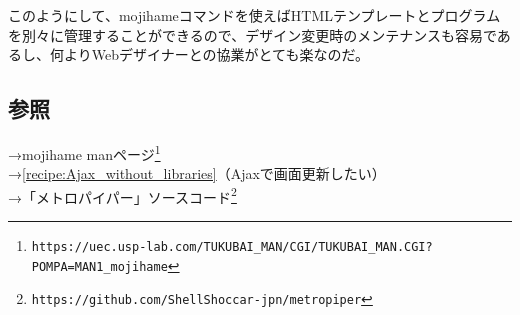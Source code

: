 このようにして、mojihameコマンドを使えばHTMLテンプレートとプログラムを別々に管理することができるので、デザイン変更時のメンテナンスも容易であるし、何よりWebデザイナーとの協業がとても楽なのだ。

\subsection*{参照}

\noindent
→mojihame manページ\footnote{\verb|https://uec.usp-lab.com/TUKUBAI_MAN/CGI/TUKUBAI_MAN.CGI?POMPA=MAN1_mojihame|} \\
→\ref{recipe:Ajax_without_libraries}（Ajaxで画面更新したい） \\
→「メトロパイパー」ソースコード\footnote{\verb|https://github.com/ShellShoccar-jpn/metropiper|}
